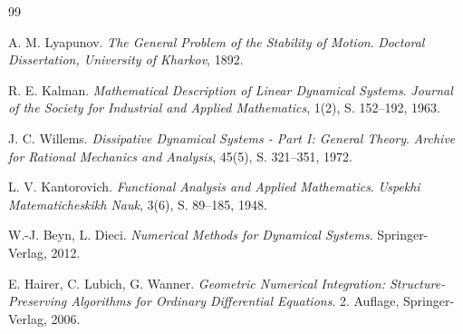 \documentclass[a4paper,12pt]{article}
\theoremstyle{definition}
\begin{document}
\begin{thebibliography}{99}

 A. M. Lyapunov. \textit{The General Problem of the Stability of Motion}. \textit{Doctoral Dissertation, University of Kharkov}, 1892.

 R. E. Kalman. \textit{Mathematical Description of Linear Dynamical Systems}. \textit{Journal of the Society for Industrial and Applied Mathematics}, 1(2), S. 152--192, 1963.

 J. C. Willems. \textit{Dissipative Dynamical Systems - Part I: General Theory}. \textit{Archive for Rational Mechanics and Analysis}, 45(5), S. 321--351, 1972.


 L. V. Kantorovich. \textit{Functional Analysis and Applied Mathematics}. \textit{Uspekhi Matematicheskikh Nauk}, 3(6), S. 89--185, 1948.

 W.-J. Beyn, L. Dieci. \textit{Numerical Methods for Dynamical Systems}. Springer-Verlag, 2012.

 E. Hairer, C. Lubich, G. Wanner. \textit{Geometric Numerical Integration: Structure-Preserving Algorithms for Ordinary Differential Equations}. 2. Auflage, Springer-Verlag, 2006.

\end{thebibliography}
\end{document}
